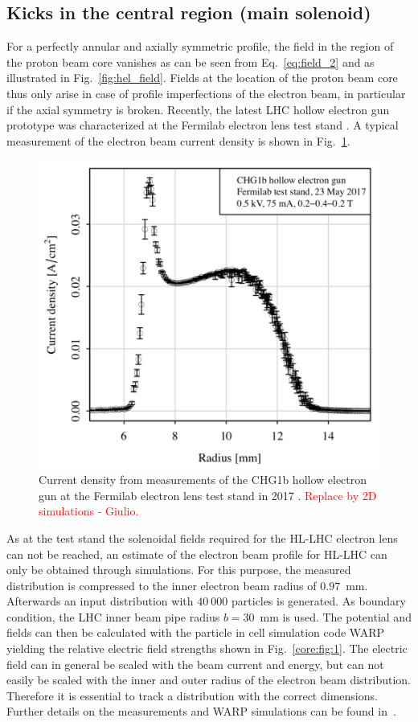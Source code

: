 \documentclass[%
 reprint,
 amsmath,amssymb,
 aps,
prstab,
]{revtex4-1}
\begin{document}
\subsection{Kicks in the central region (main solenoid)}
\label{core:sec:2}
For a perfectly annular and axially symmetric profile, the field in the region of the proton beam core vanishes as can be seen from Eq.~\ref{eq:field_2} and as illustrated in Fig.~\ref{fig:hel_field}. Fields at the location of the proton beam core thus only arise in case of profile imperfections of the electron beam, in particular if the axial symmetry is broken. Recently, the latest LHC hollow electron gun prototype was characterized at the Fermilab electron lens test stand \cite{hel_test_stand_fnal}. A typical measurement of the electron beam current density is shown in Fig.~\ref{core:fig:0}.
\begin{figure}[t]
		\centering
		\includegraphics[width=0.8\linewidth]{e-field-measured.png}
	\caption{Current density from measurements of the CHG1b hollow electron gun at the Fermilab electron lens test stand in 2017 \cite{hel_res_field_stancari_2017}. \textcolor{red}{Replace by 2D simulations - Giulio.}}
	\label{core:fig:0}
\end{figure}
As at the test stand the solenoidal fields required for the HL-LHC electron lens can not be reached, an estimate of the electron beam profile for HL-LHC can only be obtained through simulations. For this purpose, the measured distribution is compressed to the inner electron beam radius of $0.97$~mm. Afterwards an input distribution with $40\ 000$ particles is generated. As boundary condition, the LHC inner beam pipe radius $b=30$~mm is used. The potential and fields can then be calculated with the particle in cell simulation code WARP~\cite{warp} yielding the relative electric field strengths shown in Fig.~\ref{core:fig:1}. The electric field can in general be scaled with the beam current and energy, but can not easily be scaled with the inner and outer radius of the electron beam distribution. Therefore it is essential to track a distribution with the correct dimensions. Further details on the measurements and WARP simulations can be found in~\cite{hel_res_field_stancari_2017}.
\end{document}
